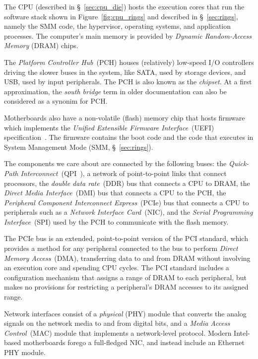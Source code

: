 The CPU (described in \S~\ref{sec:cpu_die}) hosts the execution cores that run
the software stack shown in Figure~\ref{fig:cpu_rings} and described in
\S~\ref{sec:rings}, namely the SMM code, the hypervisor, operating systems, and
application processes. The computer's main memory is provided by
\textit{Dynamic Random-Access Memory} (DRAM) chips.

The \textit{Platform Controller Hub}~(PCH) houses (relatively) low-speed I/O
controllers driving the slower buses in the system, like SATA, used by storage
devices, and USB, used by input peripherals. The PCH is also known as the
\textit{chipset}. At a first approximation, the \textit{south bridge} term in
older documentation can also be considered as a synonim for PCH.

Motherboards also have a non-volatile (flash) memory chip that hosts firmware
which implements the \textit{Unified Extensible Firmware Interface}~(UEFI)
specification~\cite{forum2015uefi}. The firmware contains the boot code and the
code that executes in System Management Mode (SMM, \S~\ref{sec:rings}).

The components we care about are connected by the following buses: the
\textit{Quick-Path Interconnect}~(QPI~\cite{intel2009qpi}), a network of
point-to-point links that connect processors, the
\textit{double data rate}~(DDR) bus that connects a CPU to DRAM, the
\textit{Direct Media Interface}~(DMI) bus that connects a CPU to the PCH, the
\textit{Peripheral Component Interconnect Express}~(PCIe) bus that connects
a CPU to peripherals such as a \textit{Network Interface Card}~(NIC), and the
\textit {Serial Programming Interface}~(SPI) used by the PCH to communicate
with the flash memory.

The PCIe bus is an extended, point-to-point version of the PCI standard, which
provides a method for any peripheral connected to the bus to perform
\textit{Direct Memory Access}~(DMA), transferring data to and from DRAM without
involving an execution core and spending CPU cycles. The PCI standard includes
a configuration mechanism that assigns a range of DRAM to each peripheral, but
makes no provisions for restricting a peripheral's DRAM accesses to its
assigned range.

Network interfaces consist of a \textit{physical} (PHY) module that converts
the analog signals on the network media to and from digital bits, and a
\textit{Media Access Control}~(MAC) module that implements a network-level
protocol. Modern Intel-based motherboards forego a full-fledged NIC, and
instead include an Ethernet~\cite{ieee8023ethernet} PHY module.


